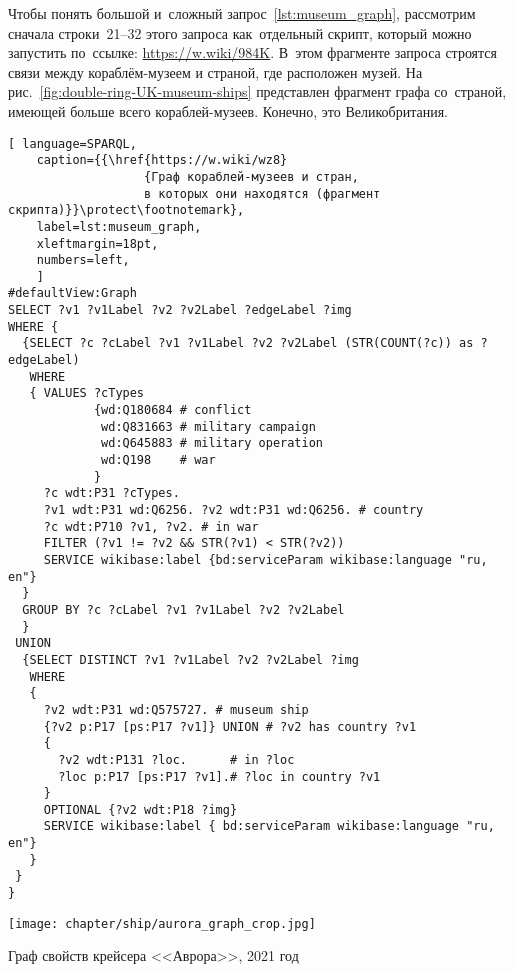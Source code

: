 Чтобы понять большой и~сложный запрос~\ref{lst:museum_graph}, 
рассмотрим сначала строки~21--32 этого запроса как~отдельный скрипт, 
который можно запустить по~ссылке: \href{https://w.wiki/984K}
                                        {https://w.wiki/984K}. 
В~этом фрагменте запроса строятся связи между кораблём-музеем и страной, где расположен музей. 
На рис.~\ref{fig:double-ring-UK-museum-ships} представлен фрагмент графа 
со~страной, имеющей больше всего кораблей-музеев. Конечно, это Великобритания. 



                                        


\newpage
\begin{lstlisting}[ language=SPARQL, 
    caption={{\href{https://w.wiki/wz8}
                   {Граф кораблей-музеев и стран, 
                   в которых они находятся (фрагмент скрипта)}}\protect\footnotemark}, 
    label=lst:museum_graph,
    xleftmargin=18pt, 
    numbers=left,
    ]
#defaultView:Graph    
SELECT ?v1 ?v1Label ?v2 ?v2Label ?edgeLabel ?img 
WHERE {
  {SELECT ?c ?cLabel ?v1 ?v1Label ?v2 ?v2Label (STR(COUNT(?c)) as ?edgeLabel) 
   WHERE
   { VALUES ?cTypes 
            {wd:Q180684 # conflict
             wd:Q831663 # military campaign
             wd:Q645883 # military operation
             wd:Q198    # war
            } 
     ?c wdt:P31 ?cTypes.
     ?v1 wdt:P31 wd:Q6256. ?v2 wdt:P31 wd:Q6256. # country
     ?c wdt:P710 ?v1, ?v2. # in war
     FILTER (?v1 != ?v2 && STR(?v1) < STR(?v2)) 
     SERVICE wikibase:label {bd:serviceParam wikibase:language "ru, en"}
  }
  GROUP BY ?c ?cLabel ?v1 ?v1Label ?v2 ?v2Label
  }
 UNION
  {SELECT DISTINCT ?v1 ?v1Label ?v2 ?v2Label ?img
   WHERE
   {
     ?v2 wdt:P31 wd:Q575727. # museum ship
     {?v2 p:P17 [ps:P17 ?v1]} UNION # ?v2 has country ?v1
     {
       ?v2 wdt:P131 ?loc.      # in ?loc
       ?loc p:P17 [ps:P17 ?v1].# ?loc in country ?v1
     } 
     OPTIONAL {?v2 wdt:P18 ?img}
     SERVICE wikibase:label { bd:serviceParam wikibase:language "ru, en"}
   }
 }
}
\end{lstlisting}


\newpage
%
\begin{marginfigure}
  \texttt{[image: chapter/ship/aurora\_graph\_crop.jpg]}
  \caption{Граф свойств крейсера <<Аврора>>, 2021 год}%
  \label{fig:aurora_graph}%
\end{marginfigure}

